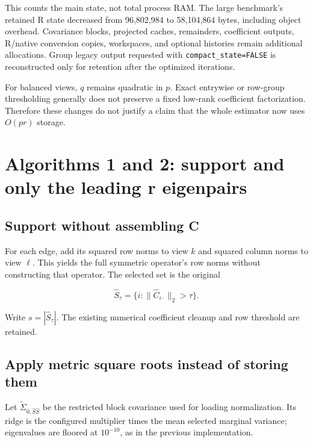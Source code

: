 \documentclass[
  11pt,
]{article}
\begin{document}
This counts the main state, not total process RAM. The large benchmark's
retained R state decreased from 96,802,984 to 58,104,864 bytes,
including object overhead. Covariance blocks, projected caches,
remainders, coefficient outputs, R/native conversion copies, workspaces,
and optional histories remain additional allocations. Group legacy
output requested with \texttt{compact\_state=FALSE} is reconstructed
only for retention after the optimized iterations.

For balanced views, \(q\) remains quadratic in \(p\). Exact entrywise or
row-group thresholding generally does not preserve a fixed low-rank
coefficient factorization. Therefore these changes do not justify a
claim that the whole estimator now uses \(O(pr)\) storage.

\hypertarget{algorithms-1-and-2-support-and-only-the-leading-r-eigenpairs}{%
\section{Algorithms 1 and 2: support and only the leading r
eigenpairs}\label{algorithms-1-and-2-support-and-only-the-leading-r-eigenpairs}}

\hypertarget{support-without-assembling-c}{%
\subsection{Support without assembling
C}\label{support-without-assembling-c}}

For each edge, add its squared row norms to view \(k\) and squared
column norms to view \(\ell\). This yields the full symmetric operator's
row norms without constructing that operator. The selected set is the
original

\[
\widehat S_\tau=\{i:\|\widehat C_{i\cdot}\|_2>\tau\}.
\]

Write \(s=|\widehat S_\tau|\). The existing numerical coefficient
cleanup and row threshold are retained.

\hypertarget{apply-metric-square-roots-instead-of-storing-them}{%
\subsection{Apply metric square roots instead of storing
them}\label{apply-metric-square-roots-instead-of-storing-them}}

Let \(\widetilde\Sigma_{0,\widehat S\widehat S}\) be the restricted
block covariance used for loading normalization. Its ridge is the
configured multiplier times the mean selected marginal variance;
eigenvalues are floored at \(10^{-10}\), as in the previous
implementation.
\end{document}
